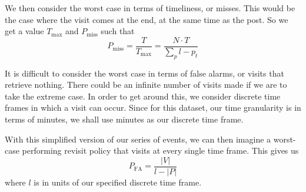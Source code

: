 We then consider the worst case in terms of timeliness, or misses. This would be 
the case where the visit comes at the end, at the same time as the post. So we 
get a value $T_{\max}$ and $P_{\text{miss}}$ such that
\[
	P_{\text{miss}} = \frac{T}{T_{\max}} = \dfrac{N \cdot T}{\sum_p l - p_t}
\]

It is difficult to consider the worst case in terms of false alarms, or visits 
that retrieve nothing. There could be an infinite number of visits made if we 
are to take the extreme case. In order to get around this, we consider discrete 
time frames in which a visit can occur. Since for this dataset, our time 
granularity is in terms of minutes, we shall use minutes as our discrete time 
frame.

With this simplified version of our series of events, we can then imagine a 
worst-case performing revisit policy that visits at every single time frame.  
This gives us
\[
	P_{\text{FA}} = \frac{|V|}{l - |P|}
\]
where $l$ is in units of our specified discrete time frame.


